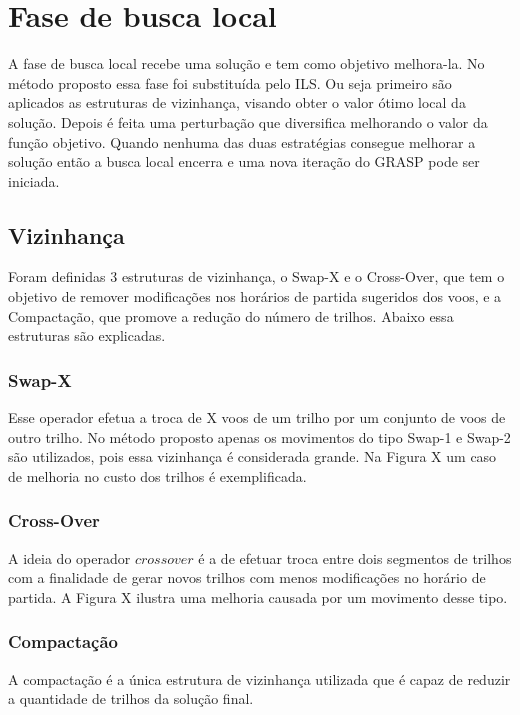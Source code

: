  \section{Fase de busca local}
 
A fase de busca local recebe uma solução e tem como objetivo melhora-la. No
método proposto essa fase foi substituída pelo ILS. Ou seja primeiro são
aplicados as estruturas de vizinhança, visando obter o valor ótimo local da
solução. Depois é feita uma perturbação que diversifica melhorando o valor da
função objetivo. Quando nenhuma das duas estratégias consegue melhorar a
solução então a busca local encerra e uma nova iteração do GRASP pode ser
iniciada.
 
 \subsection{Vizinhança}
 
Foram definidas 3 estruturas de vizinhança, o Swap-X e o Cross-Over, que tem o
objetivo de remover modificações nos horários de partida sugeridos dos voos, e
a Compactação, que promove a redução do número de trilhos. Abaixo essa
estruturas são explicadas.
 
\subsubsection{Swap-X}

Esse operador efetua a troca de X voos de um trilho por um conjunto de voos de
outro trilho. No método proposto apenas os movimentos do tipo Swap-1 e Swap-2
são utilizados, pois essa vizinhança é considerada grande. Na Figura X um caso
de melhoria no custo dos trilhos é exemplificada.
 
 \subsubsection{Cross-Over}
 
A ideia do operador $crossover$ é a de efetuar troca entre dois segmentos de
trilhos com a finalidade de gerar novos trilhos com menos modificações no
horário de partida. A Figura X ilustra uma melhoria causada por um movimento
desse tipo.
 
 \subsubsection{Compactação}
 
A compactação é a única estrutura de vizinhança utilizada que é capaz de
reduzir a quantidade de trilhos da solução final.
 
